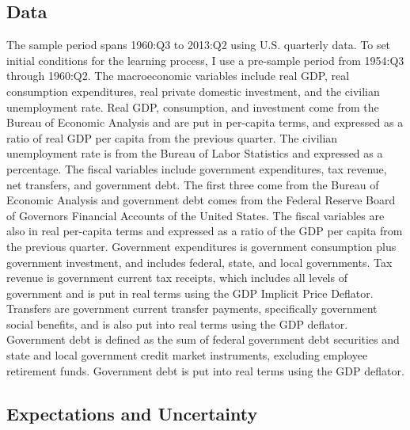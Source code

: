 \documentclass[11pt]{article}
\begin{document}
\subsection{Data}
The sample period spans 1960:Q3 to 2013:Q2 using U.S. quarterly data.  To set initial conditions for the learning process, I use a pre-sample period from 1954:Q3 through 1960:Q2.  The macroeconomic variables include real GDP, real consumption expenditures, real private domestic investment, and the civilian unemployment rate.  Real GDP, consumption, and investment come from the Bureau of Economic Analysis and are put in per-capita terms, and expressed as a ratio of real GDP per capita from the previous quarter.  The civilian unemployment rate is from the Bureau of Labor Statistics and expressed as a percentage.  The fiscal variables include government expenditures, tax revenue, net transfers, and government debt.  The first three come from the Bureau of Economic Analysis and government debt comes from the Federal Reserve Board of Governors Financial Accounts of the United States.  The fiscal variables are also in real per-capita terms and expressed as a ratio of the GDP per capita from the previous quarter.  Government expenditures is government consumption plus government investment, and includes federal, state, and local governments.  Tax revenue is government current tax receipts, which includes all levels of government and is put in real terms using the GDP Implicit Price Deflator.  Transfers are government current transfer payments, specifically government social benefits, and is also put into real terms using the GDP deflator.  Government debt is defined as the sum of federal government debt securities and state and local government credit market instruments, excluding employee retirement funds.  Government debt is put into real terms using the GDP deflator.

\subsection{Expectations and Uncertainty}\label{s:exp}
\end{document}
